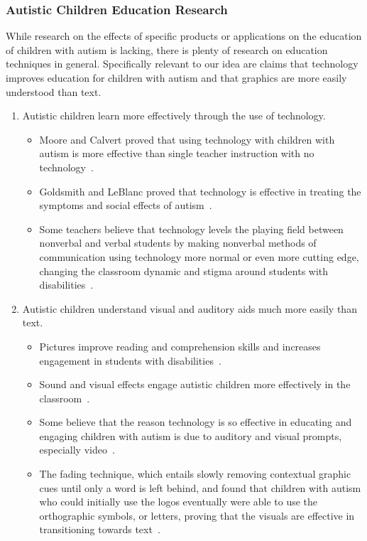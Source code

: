 \subsubsection{Autistic Children Education Research}
While research on the effects of specific products or applications on the education of children with autism is lacking, there is plenty of research on education techniques in general. Specifically relevant to our idea are claims that technology improves education for children with autism and that graphics are more easily understood than text.
\begin{enumerate}\bfseries
\item Autistic children learn more effectively through the use of technology.
\begin{itemize}
\item  \textnormal{Moore and Calvert proved that using technology with children with autism is more effective than single teacher instruction with no technology~\cite{moore}.}
\item  \textnormal{Goldsmith and LeBlanc proved that technology is effective in treating the symptoms and social effects of autism~\cite{goldsmith}.}
\item  \textnormal{Some teachers believe that technology levels the playing field between nonverbal and verbal students by making nonverbal methods of communication using technology more normal or even more cutting edge, changing the classroom dynamic and stigma around students with disabilities~\cite{riechmann}.}
\end{itemize}
\item Autistic children  understand visual and auditory aids much more easily than text.
\begin{itemize}
\item  \textnormal{Pictures improve reading and comprehension skills and increases engagement in students with disabilities~\cite{slater}.}
\item  \textnormal{Sound and visual effects engage autistic children more effectively in the classroom~\cite{moore}.}
\item  \textnormal{Some believe that the reason technology is so effective in educating and engaging children with autism is due to auditory and visual prompts, especially video~\cite{goldsmith}.}
\item  \textnormal{The fading technique, which entails slowly removing contextual graphic cues until only a word is left behind, and found that children with autism who could initially use the logos eventually were able to use the orthographic symbols, or letters, proving that the visuals are effective in transitioning towards text~\cite{hetzroni}.}
\end{itemize}
\end{enumerate}

